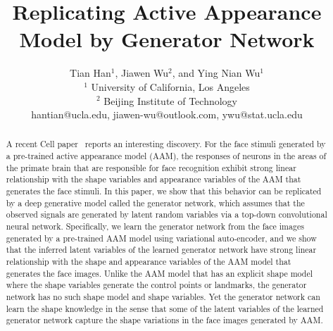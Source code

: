 \documentclass{article}
\title{Replicating Active Appearance Model by Generator Network}
\author{
Tian Han$^1$,
Jiawen Wu$^2$,
and Ying Nian Wu$^1$
\\
$^1$ University of California, Los Angeles \\
$^2$ Beijing Institute of Technology \\
%
hantian@ucla.edu,
jiawen-wu@outlook.com,
ywu@stat.ucla.edu
}
\begin{document}
\maketitle

\begin{abstract}
A recent Cell paper~\cite{chang2017code} reports an interesting discovery. For the face stimuli generated by a pre-trained active appearance model (AAM), the responses of neurons in the areas of the primate brain that are responsible for face recognition exhibit strong linear relationship with the shape variables and appearance variables of the AAM that generates the face stimuli.
In this paper, we show that this behavior can be replicated by a deep generative model called the generator network, which assumes that the observed signals are generated by  latent random variables  via a top-down convolutional neural network. Specifically, we  learn the generator network from the face images generated by a pre-trained AAM model using variational auto-encoder, and we show that the inferred latent variables of the learned generator network have strong linear relationship with the shape and appearance variables of the AAM model that generates the face images. Unlike the AAM model that has an explicit shape model where the shape variables generate the control points or landmarks, the generator network has no such shape model and shape variables.  Yet the generator network can learn the shape knowledge in the sense that  some of the latent variables of the learned generator network capture the shape variations in the face images generated by AAM.
\end{abstract}
\end{document}
